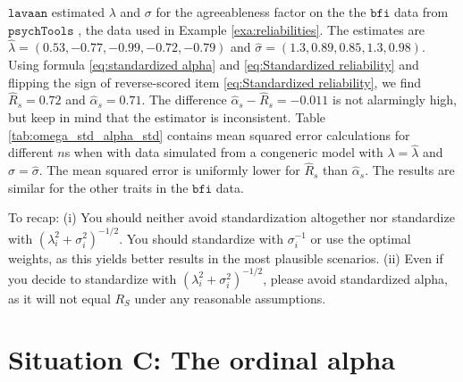 \documentclass[twoside]{article}
\begin{document}
\begin{example}

$\mathtt{lavaan}$ estimated $\lambda$ and $\sigma$ for the agreeableness factor on the the $\texttt{bfi}$ data from $\texttt{psychTools}$ \citep{Revelle2019-te}, the data used in Example \ref{exa:reliabilities}. The estimates are $\hat{\lambda} = (0.53, -0.77, -0.99, -0.72, -0.79)$ and $\hat{\sigma} = (1.3, 0.89, 0.85, 1.3, 0.98)$. Using formula \eqref{eq:standardized alpha} and \eqref{eq:Standardized reliability} and flipping the sign of reverse-scored item \eqref{eq:Standardized reliability}, we find $\hat{ R}_s = 0.72$ and $\hat{\alpha}_s = 0.71$. The difference $\hat{\alpha}_s - \hat{ R}_s = -0.011$ is not alarmingly high, but keep in mind that the estimator is inconsistent. Table \ref{tab:omega_std_alpha_std} contains mean squared error calculations for different $n$s when with data simulated from a congeneric model with $\lambda=\hat{\lambda}$ and $\sigma = \hat{\sigma}$. The mean squared error is uniformly lower for $\hat{ R}_s$ than $\hat{\alpha}_s$. The results are similar for the other traits in the $\texttt{bfi}$ data.
\end{example}

To recap: (i) You should neither avoid standardization altogether nor standardize with $(\lambda_{i}^{2}+\sigma_{i}^{2})^{-1/2}$. You should standardize with $\sigma_i^{-1}$ or use the optimal weights, as this yields better results in the most plausible scenarios. (ii) Even if you decide to standardize with $(\lambda_{i}^{2}+\sigma_{i}^{2})^{-1/2}$, please avoid standardized alpha, as it will not equal $ R_S$ under any reasonable assumptions.

\section{Situation C: The ordinal alpha \label{sec:Ordinal alpha}}
\end{document}
